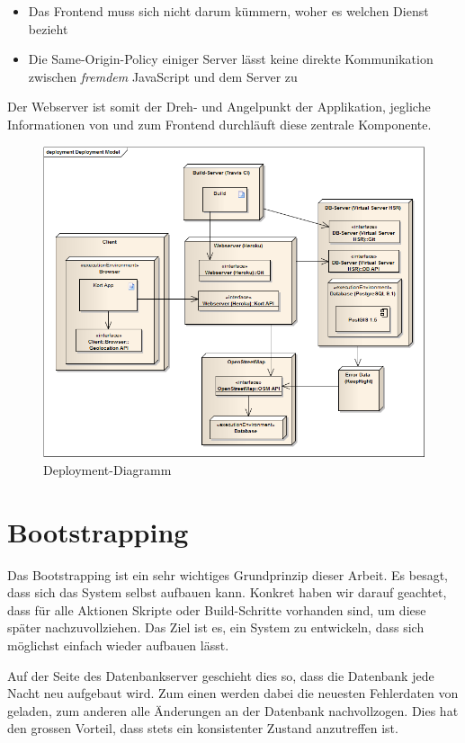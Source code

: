 \begin{itemize}
\item Das Frontend muss sich nicht darum kümmern, woher es welchen Dienst bezieht
\item Die Same-Origin-Policy\cite{sop} einiger Server lässt keine direkte Kommunikation zwischen \emph{fremdem} JavaScript und dem Server zu
\end{itemize}

Der Webserver ist somit der Dreh- und Angelpunkt der Applikation, jegliche Informationen von und zum Frontend durchläuft diese zentrale Komponente.

\begin{figure}[H]
	\centering
	\includegraphics[width=\textwidth]{images/uml/deployment_diagram}
	\caption{Deployment-Diagramm}
	\label{deplyoyment-diagram}
\end{figure}

\section{Bootstrapping}
Das \gls{Bootstrapping} ist ein sehr wichtiges Grundprinzip dieser Arbeit.
Es besagt, dass sich das System selbst aufbauen kann.
Konkret haben wir darauf geachtet, dass für alle Aktionen Skripte oder Build-Schritte vorhanden sind, um diese später nachzuvollziehen.
Das Ziel ist es, ein System zu entwickeln, dass sich möglichst einfach wieder aufbauen lässt.

Auf der Seite des Datenbankserver geschieht dies so, dass die Datenbank jede Nacht neu aufgebaut wird.
Zum einen werden dabei die neuesten Fehlerdaten von  geladen, zum anderen alle Änderungen an der Datenbank nachvollzogen.
Dies hat den grossen Vorteil, dass stets ein konsistenter Zustand anzutreffen ist.

